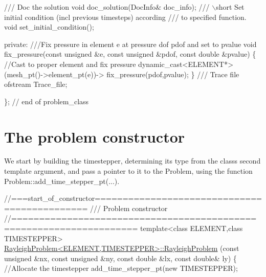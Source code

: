 \begin{DoxyCodeInclude}
 \textcolor{comment}{}
\textcolor{comment}{ /// Doc the solution}
\textcolor{comment}{} \textcolor{keywordtype}{void} doc\_solution(DocInfo& doc\_info);
\textcolor{comment}{}
\textcolor{comment}{ /// \(\backslash\)short Set initial condition (incl previous timesteps) according}
\textcolor{comment}{ /// to specified function. }
\textcolor{comment}{} \textcolor{keywordtype}{void} set\_initial\_condition();

\textcolor{keyword}{private}:
\textcolor{comment}{}
\textcolor{comment}{ ///Fix pressure in element e at pressure dof pdof and set to pvalue}
\textcolor{comment}{} \textcolor{keywordtype}{void} fix\_pressure(\textcolor{keyword}{const} \textcolor{keywordtype}{unsigned} &e, \textcolor{keyword}{const} \textcolor{keywordtype}{unsigned} &pdof, 
                   \textcolor{keyword}{const} \textcolor{keywordtype}{double} &pvalue)
  \{
   \textcolor{comment}{//Cast to proper element and fix pressure}
   \textcolor{keyword}{dynamic\_cast<}ELEMENT*\textcolor{keyword}{>}(mesh\_pt()->element\_pt(e))->
                          fix\_pressure(pdof,pvalue);
  \}
\textcolor{comment}{}
\textcolor{comment}{ /// Trace file}
\textcolor{comment}{} ofstream Trace\_file;

\}; \textcolor{comment}{// end of problem\_class}

\end{DoxyCodeInclude}




 

\hypertarget{index_constructor}{}\section{The problem constructor}\label{index_constructor}
We start by building the timestepper, determining its type from the class\textquotesingle{}s second template argument, and pass a pointer to it to the Problem, using the function {\ttfamily Problem\+::add\+\_\+time\+\_\+stepper\+\_\+pt}(...).


\begin{DoxyCodeInclude}
\textcolor{comment}{//===start\_of\_constructor=============================================}
\textcolor{comment}{/// Problem constructor}
\textcolor{comment}{}\textcolor{comment}{//====================================================================}
\textcolor{keyword}{template}<\textcolor{keyword}{class} ELEMENT,\textcolor{keyword}{class} TIMESTEPPER>
\hyperlink{classRayleighProblem_a53aeda7918553889b3fa0dd70cdb30f1}{RayleighProblem<ELEMENT,TIMESTEPPER>::RayleighProblem}
(\textcolor{keyword}{const} \textcolor{keywordtype}{unsigned} &nx, \textcolor{keyword}{const} \textcolor{keywordtype}{unsigned} &ny,
 \textcolor{keyword}{const} \textcolor{keywordtype}{double} &lx, \textcolor{keyword}{const} \textcolor{keywordtype}{double}& ly)
\{
 \textcolor{comment}{//Allocate the timestepper}
 add\_time\_stepper\_pt(\textcolor{keyword}{new} TIMESTEPPER); 

\end{DoxyCodeInclude}


